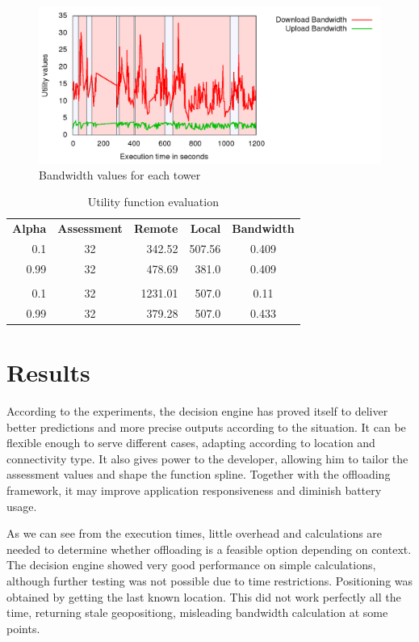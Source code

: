 \documentclass[10pt, conference, letterpaper]{IEEEtran}
\begin{document}
\begin{figure}[!b]
  \centering
  \includegraphics[width=1\textwidth]{results/plots/bw-fluctuation/executions.png}
  \caption{Bandwidth values for each tower}
  \label{fig:bwtower}
\end{figure}


  \begin{table}[!t]
  \centering
  \caption{Utility function evaluation}
  \label{table:alpha}
  \begin{tabular}{rcrrc}
    \textbf{Alpha} & \textbf{Assessment} & \textbf{Remote} & \textbf{Local} & \textbf{Bandwidth} \\
   0.1 & 32  & 342.52 & 507.56 & 0.409  \\
   0.99 & 32  & 478.69 & 381.0 & 0.409  \\
   &  & & &  \\
   0.1 & 32  & 1231.01 & 507.0 & 0.11  \\
   0.99 & 32  & 379.28 & 507.0 & 0.433  \\
  \end{tabular}
  \end{table}

  \section{Results}
  According to the experiments, the decision engine has proved itself to deliver better predictions and more precise outputs according to the situation. It can be flexible enough to serve different cases, adapting according to location and connectivity type. It also gives power to the developer, allowing him to tailor the assessment values and shape the function spline. Together with the offloading framework, it may improve application responsiveness and diminish battery usage.
  
  As we can see from the execution times, little overhead and calculations are needed to determine whether offloading is a feasible option depending on context. The decision engine showed very good performance on simple calculations, although further testing was not possible due to time restrictions. Positioning was obtained by getting the last known location. This did not work perfectly all the time, returning stale geopositiong, misleading bandwidth calculation at some points.
\end{document}
